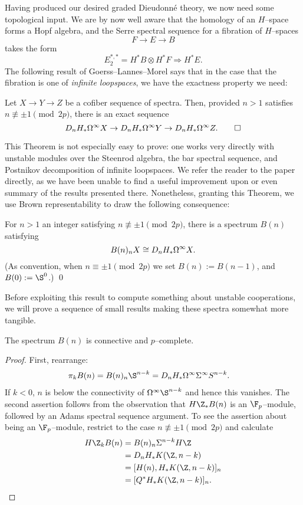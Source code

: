 Having produced our desired graded Dieudonn\'e theory, we now need some topological input.  We are by now well aware that the homology of an $H$--space forms a Hopf algebra, and the Serre spectral sequence for a fibration of $H$--spaces \[F \to E \to B\] takes the form \[E_2^{*, *} = H^* B \otimes H^* F \Rightarrow H^* E.\]  The following result of Goerss--Lannes--Morel says that in the case that the fibration is one of \emph{infinite loopspaces}, we have the exactness property we need:

\begin{theorem}
Let $X \to Y \to Z$ be a cofiber sequence of spectra.  Then, provided $n > 1$ satisfies $n \not\equiv \pm 1 \pmod{2p}$, there is an exact sequence \[D_n H_* \Omega^\infty X \to D_n H_* \Omega^\infty Y \to D_n H_* \Omega^\infty Z. \qed\]
\end{theorem}

\noindent This Theorem is not especially easy to prove: one works very directly with unstable modules over the Steenrod algebra, the bar spectral sequence, and Postnikov decomposition of infinite loopspaces.  We refer the reader to the paper directly, as we have been unable to find a useful improvement upon or even summary of the results presented there.  Nonetheless, granting this Theorem, we use Brown representability to draw the following consequence:

\begin{corollary}\label{BrownGitlerSpectraDefn}
For $n > 1$ an integer satisfying $n \not\equiv \pm 1 \pmod{2p}$, there is a spectrum $B(n)$ satisfying \[B(n)_n X \cong D_n H_* \Omega^\infty X.\] (As convention, when $n \equiv \pm 1 \pmod{2p}$ we set $B(n) := B(n-1)$, and $B(0) := \S^0$.) \qed
\end{corollary}

Before exploiting this result to compute something about unstable cooperations, we will prove a sequence of small results making these spectra somewhat more tangible.

\begin{lemma}
The spectrum $B(n)$ is connective and $p$--complete.
\end{lemma}
\begin{proof}
First, rearrange:
\begin{align*}
\pi_k B(n) & = B(n)_n \S^{n-k} = D_n H_* \Loops^\infty \Susp^\infty S^{n-k}.
\end{align*}
If $k < 0$, $n$ is below the connectivity of $\Loops^\infty \S^{n-k}$ and hence this vanishes.  The second assertion follows from the observation that $H\Z_* B(n)$ is an $\F_p$--module, followed by an Adams spectral sequence argument.  To see the assertion about being an $\F_p$--module, restrict to the case $n \not\equiv \pm 1 \pmod{2p}$ and calculate
\begin{align*}
H\Z_k B(n) & = B(n)_n \Susp^{n-k} H\Z \\
& = D_n H_* K(\Z, n-k) \\
& = [H(n), H_* K(\Z, n-k)]_n \\
& = [Q^* H_* K(\Z, n-k)]_n. \qedhere
\end{align*}
\end{proof}

